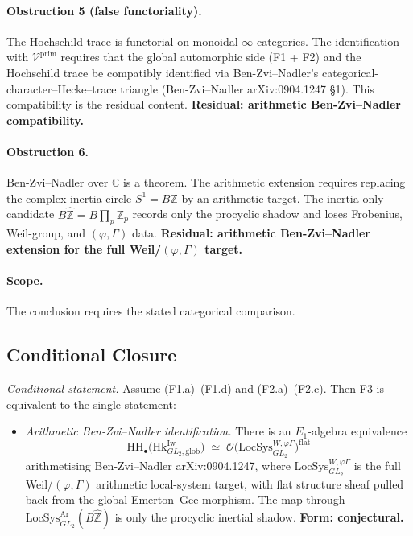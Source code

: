\paragraph{Obstruction 5 (false functoriality).} The Hochschild trace is
functorial on monoidal \(\infty\)-categories. The identification
with \(\mathcal{V}^{\mathrm{prim}}\) requires that the global
automorphic side (F1 + F2) and the Hochschild trace be compatibly
identified via Ben-Zvi--Nadler's categorical-character--Hecke--trace
triangle (Ben-Zvi--Nadler arXiv:0904.1247 \S1). This compatibility is
the residual content. \textbf{Residual: arithmetic Ben-Zvi--Nadler
compatibility.}

\paragraph{Obstruction 6.} Ben-Zvi--Nadler over \(\mathbb{C}\) is a theorem.
The arithmetic extension requires replacing the complex inertia
circle \(S^{1}=B\mathbb{Z}\) by an arithmetic target. The
inertia-only candidate \(B\widehat{\mathbb{Z}}=B\prod_{p}\mathbb{Z}_{p}\)
records only the procyclic shadow and loses Frobenius, Weil-group,
and \((\varphi,\Gamma)\) data. \textbf{Residual: arithmetic
Ben-Zvi--Nadler extension for the full Weil/\((\varphi,\Gamma)\)
target.}

\paragraph{Scope.} The conclusion requires the stated categorical comparison.

\subsection{Conditional Closure}

\begin{theorem}
\label{v4-arith:thm:F3-reduction}
\emph{Conditional statement.} Assume (F1.a)--(F1.d) and
(F2.a)--(F2.c). Then F3 is equivalent to the single statement:
\begin{itemize}
\item[\textbf{(F3.BZN\(^{\mathrm{Ar}}\))}] \emph{Arithmetic
Ben-Zvi--Nadler identification.} There is an \(E_{1}\)-algebra
equivalence
\begin{equation}
\mathrm{HH}_{\bullet}\bigl(\mathrm{Hk}^{\mathrm{Iw}}_{GL_{2},\mathrm{glob}}\bigr)
\;\simeq\;
\mathcal{O}\bigl(\mathrm{LocSys}^{W,\varphi\Gamma}_{GL_{2}}\bigr)^{\mathrm{flat}}
\end{equation}
arithmetising Ben-Zvi--Nadler arXiv:0904.1247, where
\(\mathrm{LocSys}^{W,\varphi\Gamma}_{GL_{2}}\) is the full
Weil/\((\varphi,\Gamma)\) arithmetic local-system target, with flat
structure sheaf pulled back from the global Emerton--Gee morphism.
The map through \(\mathrm{LocSys}_{GL_{2}}^{\mathrm{Ar}}(B\widehat{\mathbb{Z}})\)
is only the procyclic inertial shadow.
\textbf{Form: conjectural.}
\end{itemize}
\end{theorem}

